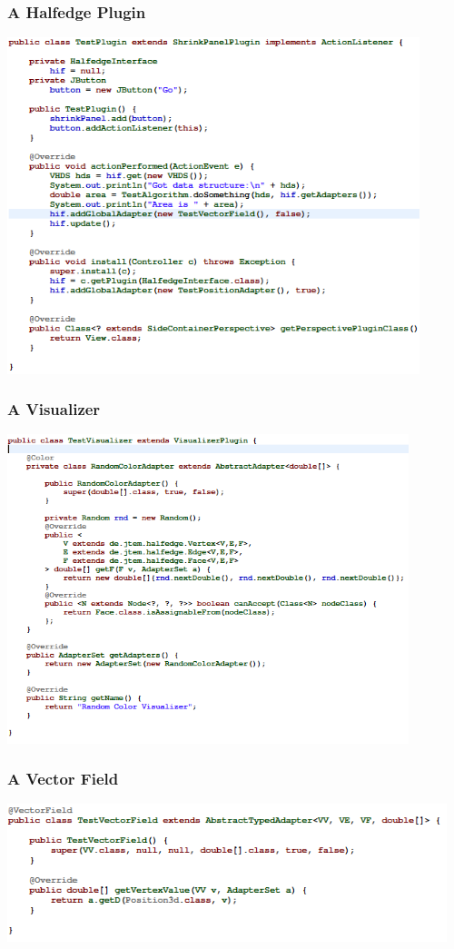 \documentclass[12pt]{beamer}
\begin{document}
\begin{frame}
\frametitle{A Halfedge Plugin}
\begin{center}
\includegraphics[height=9.8cm]{testplugin.png}\\	
\end{center}
\end{frame}

\begin{frame}
\frametitle{A Visualizer}
\begin{center}
\includegraphics[height=9cm]{visualizer.png}\\	
\end{center}
\end{frame}

\begin{frame}
\frametitle{A Vector Field}
\begin{center}
\includegraphics[height=4cm]{vectorfield.png}\\	
\end{center}
\end{frame}
\end{document}
